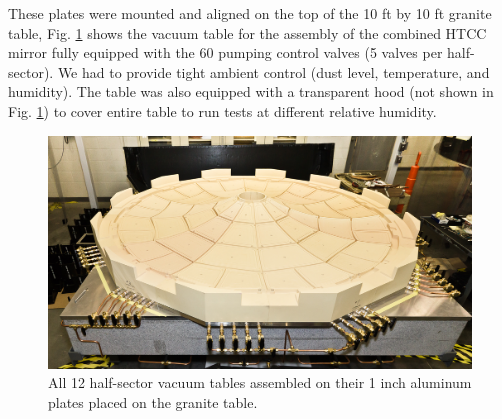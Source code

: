 \indent These plates were mounted and aligned on the top of the 10 ft by 10 ft granite table, Fig. \ref{fig:Twelve_Foam_Vacuum_Tables} shows the vacuum table for the assembly of the combined HTCC mirror fully equipped with the 60 pumping control valves (5 valves per half-sector). We had to provide tight ambient control (dust level, temperature, and humidity). The table was also equipped with a transparent hood (not shown in Fig. \ref{fig:Twelve_Foam_Vacuum_Tables}) to cover entire table to run tests at different relative humidity.   

\begin{figure}[ht]
    \centering
    \includegraphics[width=1.0\linewidth]{images/Twelve_Foam_Vacuum_Tables.jpg}
    \caption{All 12 half-sector vacuum tables assembled on their 1 inch aluminum plates placed on the granite table.}
    \label{fig:Twelve_Foam_Vacuum_Tables}
\end{figure}

